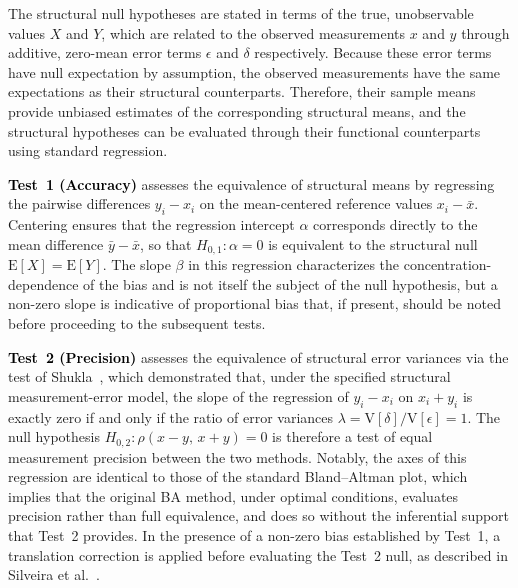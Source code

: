 The structural null hypotheses are stated in terms of the true, unobservable values $X$ and $Y$, which are related to the observed measurements $x$ and $y$ through additive, zero-mean error terms $\epsilon$ and $\delta$ respectively. Because these error terms have null expectation by assumption, the observed measurements have the same expectations as their structural counterparts. Therefore, their sample means provide unbiased estimates of the corresponding structural means, and the structural hypotheses can be evaluated through their functional counterparts using standard regression.

\textcolor{black}{\textbf{Test~1 (Accuracy)}} assesses the equivalence of structural means by regressing the pairwise differences $y_i - x_i$ on the mean-centered reference values $x_i - \bar{x}$. Centering ensures that the regression intercept $\alpha$ corresponds directly to the mean difference $\bar{y} - \bar{x}$, so that $H_{0,1}: \alpha = 0$ is equivalent to the structural null $\text{E}[X] = \text{E}[Y]$. The slope $\beta$ in this regression characterizes the concentration-dependence of the bias and is not itself the subject of the null hypothesis, but a non-zero slope is indicative of proportional bias that, if present, should be noted before proceeding to the subsequent tests.

\textcolor{black}{\textbf{Test~2 (Precision)}} assesses the equivalence of structural error variances via the test of Shukla~\cite{Shukla1973}, which demonstrated that, under the specified structural measurement-error model, the slope of the regression of $y_i - x_i$ on $x_i + y_i$ is exactly zero if and only if the ratio of error variances $\lambda = \text{V}[\delta] / \text{V}[\epsilon] = 1$. The null hypothesis $H_{0,2}: \rho(x - y,\, x + y) = 0$ is therefore a test of equal measurement precision between the two methods. Notably, the axes of this regression are identical to those of the standard Bland--Altman plot, which implies that the original BA method, under optimal conditions, evaluates precision rather than full equivalence, and does so without the inferential support that Test~2 provides. In the presence of a non-zero bias established by Test~1, a translation correction is applied before evaluating the Test~2 null, as described in Silveira et al.~\cite{Silveira2024}.


